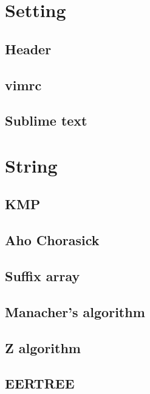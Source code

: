 \documentclass[10pt,landscape,a4paper,twocolumn]{article}
\begin{document}
\tableofcontents

\section{Setting}
\subsection{Header}


\subsection{vimrc}


\subsection{Sublime text}


\section{String}
\subsection{KMP}


\subsection{Aho Chorasick}


\subsection{Suffix array}


\subsection{Manacher's algorithm}


\subsection{Z algorithm}


\subsection{EERTREE}

\end{document}

